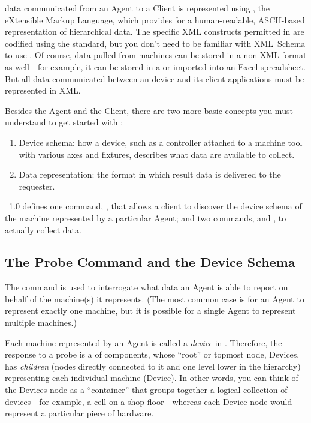 \mtc{} data communicated from an Agent to a Client is represented using
, the eXtensible Markup Language, which provides for a
human-readable, ASCII-based representation of hierarchical data.  The
specific XML constructs permitted in \mtc are codified using the
 standard, but you don't need to be familiar with
XML~Schema to use \mtc.  Of course, data pulled from machines can be
stored in a non-XML format as well---for example, it can be stored in a
 or imported into an Excel spreadsheet.  But
all data communicated between an \mtc{} device and its client
applications must be represented in XML.

Besides the Agent and the Client, there are two more basic concepts you
must understand to get started with \mtc:

\begin{enumerate}
\item Device schema: how a device, such as a controller attached to a
  machine tool with various axes and fixtures, describes what data are
  available to collect.
\item Data representation: the format in which  result data
 is delivered to the requester.
\end{enumerate}

\mtc~1.0 defines one command, , that allows a client to
discover the device schema of the machine represented by a particular
Agent; and two commands,  and , to actually
collect data.

\subsection{The Probe Command and the Device Schema}

The \mtc{}  command is used to interrogate what data an
Agent is able to report on behalf of the machine(s) it represents.
(The most common case
is for an Agent to represent exactly one machine, but it is possible for
a single Agent to represent multiple machines.)  

Each machine represented by an Agent is called a \emph{device} in \mtc.
Therefore, the response to a probe is a  of components,
whose ``root'' or 
topmost node, Devices, has \emph{children} 
(nodes directly connected to it and one level lower in the hierarchy)
representing each  individual machine (Device).  
In other words, you can think of the Devices
node as a ``container'' that groups together a logical collection of
devices---for example, a cell on a shop floor---whereas each Device node
would represent a particular piece of hardware.  

